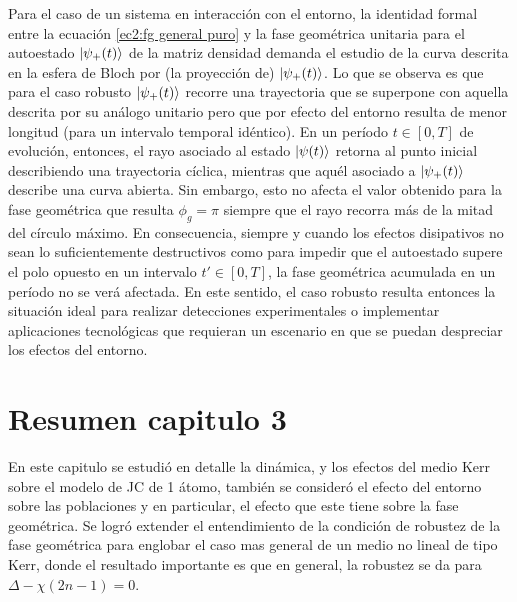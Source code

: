 Para el caso de un sistema en interacción con el entorno, la identidad formal entre la ecuación \ref{ec2:fg general puro} y la fase geométrica unitaria para el autoestado $\ket{\psi_+(t)}$ de la matriz densidad demanda el estudio de la curva descrita en la esfera de Bloch por (la proyección de) $\ket{\psi_+(t)}$. Lo que se observa es que para el caso robusto $\ket{\psi_+(t)}$ recorre una trayectoria que se superpone con aquella descrita por su análogo unitario pero que por efecto del entorno resulta de menor longitud (para un intervalo temporal idéntico). En un período $t \in [0, T]$ de evolución, entonces, el rayo asociado al estado $\ket{\psi(t)}$ retorna al punto inicial describiendo una trayectoria cíclica, mientras que aquél asociado a $\ket{\psi_+(t)}$ describe una curva abierta. Sin embargo, esto no afecta el valor obtenido para la fase geométrica que resulta $\phi_g=\pi$ siempre que el rayo recorra más de la mitad del círculo máximo. En consecuencia, siempre y cuando los efectos disipativos no sean lo suficientemente destructivos como para impedir que el autoestado supere el polo opuesto en un intervalo $t' \in [0, T]$, la fase geométrica acumulada en un período no se verá afectada. En este sentido, el caso robusto resulta entonces la situación ideal para realizar detecciones experimentales o implementar aplicaciones tecnológicas que requieran un escenario en que se puedan despreciar los efectos del entorno.

\section{Resumen capitulo 3}
En este capitulo se estudió en detalle la dinámica, y los efectos del medio Kerr sobre el modelo de JC de 1 átomo, también se consideró el efecto del entorno sobre las poblaciones y en particular, el efecto que este tiene sobre la fase geométrica. Se logró extender el entendimiento de la condición de robustez de la fase geométrica \cite{Viotti2022} para englobar el caso mas general de un medio no lineal de tipo Kerr, donde el resultado importante es que en general, la robustez se da para $\Delta-\chi(2n-1)=0$. 
